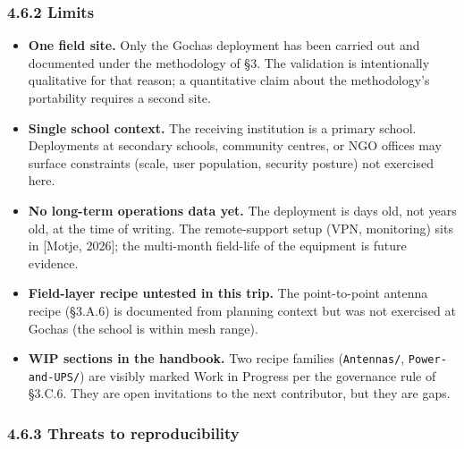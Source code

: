 \hypertarget{limits}{%
\subsubsection{4.6.2 Limits}\label{limits}}

\begin{itemize}
\tightlist
\item
  \textbf{One field site.} Only the Gochas deployment has been carried
  out and documented under the methodology of §3. The validation is
  intentionally qualitative for that reason; a quantitative claim about
  the methodology's portability requires a second site.
\item
  \textbf{Single school context.} The receiving institution is a primary
  school. Deployments at secondary schools, community centres, or NGO
  offices may surface constraints (scale, user population, security
  posture) not exercised here.
\item
  \textbf{No long-term operations data yet.} The deployment is days old,
  not years old, at the time of writing. The remote-support setup (VPN,
  monitoring) sits in {[}Motje, 2026{]}; the multi-month field-life of
  the equipment is future evidence.
\item
  \textbf{Field-layer recipe untested in this trip.} The point-to-point
  antenna recipe (§3.A.6) is documented from planning context but was
  not exercised at Gochas (the school is within mesh range).
\item
  \textbf{WIP sections in the handbook.} Two recipe families
  (\texttt{Antennas/}, \texttt{Power-and-UPS/}) are visibly marked Work
  in Progress per the governance rule of §3.C.6. They are open
  invitations to the next contributor, but they are gaps.
\end{itemize}

\hypertarget{threats-to-reproducibility}{%
\subsubsection{4.6.3 Threats to
reproducibility}\label{threats-to-reproducibility}}

